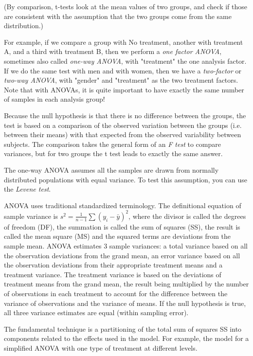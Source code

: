 (By comparison, t-tests look at the mean values of two groups, and check if those are consistent with the assumption that the two groups come from the same distribution.)

For example, if we compare a group with No treatment, another with treatment A, and a third with treatment B, then we perform a \emph{one factor ANOVA}, sometimes also called \emph{one-way ANOVA}, with "treatment" the one analysis factor. If we do the same test with men and with women, then we have a \emph{two-factor} or \emph{two-way ANOVA}, with "gender" and "treatment" as the two treatment factors. Note that with ANOVAs, it is quite important to have exactly the same number of samples in each analysis group!

Because the null hypothesis is that there is no difference between the groups, the test is based on a comparison of the observed variation between the groups (i.e. between their means) with that expected from the observed variability between subjects. The comparison takes the general form of an \emph{F test} to compare variances, but for two groups the t test leads to exactly the same answer.

The one-way ANOVA assumes all the samples are drawn from normally distributed populations with equal variance. To test this assumption, you can use the \emph{Levene test}.

ANOVA uses traditional standardized terminology. The definitional equation
of sample variance is $s^2=\textstyle\frac{1}{n-1}\sum(y_i-\bar{y})^2$,
where
the divisor is called the degrees of freedom (DF), the summation is called
the sum of squares (SS), the result is called the mean square (MS) and the
squared terms are deviations from the sample mean. ANOVA estimates 3 sample
variances: a total variance based on all the observation deviations from the
grand mean, an error variance based on all the observation deviations from
their appropriate treatment means and a treatment variance. The treatment
variance is based on the deviations of treatment means from the grand mean,
the result being multiplied by the number of observations in each treatment
to account for the difference between the variance of observations and the
variance of means. If the null hypothesis is true, all three variance
estimates are equal (within sampling error).

The fundamental technique is a partitioning of the total sum of squares SS
into components related to the effects used in the model. For example, the
model for a simplified ANOVA with one type of treatment at different levels.

